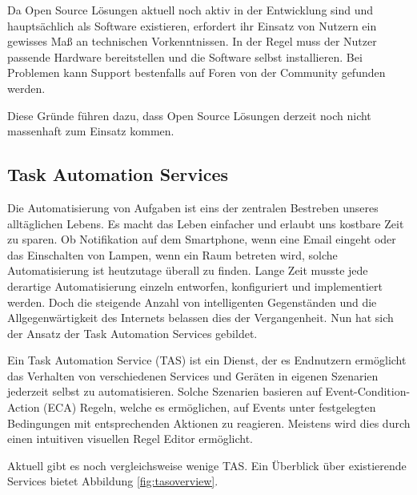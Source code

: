 Da Open Source Lösungen aktuell noch aktiv in der Entwicklung sind und hauptsächlich als Software existieren, erfordert ihr Einsatz von Nutzern ein gewisses Maß an technischen Vorkenntnissen. In der Regel muss der Nutzer passende Hardware bereitstellen und die Software selbst installieren. Bei Problemen kann Support bestenfalls auf Foren von der Community gefunden werden. 

Diese Gründe führen dazu, dass Open Source Lösungen derzeit noch nicht massenhaft zum Einsatz kommen.



\subsection{Task Automation Services}
\label{subsec:tas}
Die Automatisierung von Aufgaben ist eins der zentralen Bestreben unseres alltäglichen Lebens. Es macht das Leben einfacher und erlaubt uns kostbare Zeit zu sparen. Ob Notifikation auf dem Smartphone, wenn eine Email eingeht oder das Einschalten von Lampen, wenn ein Raum betreten wird, solche Automatisierung ist heutzutage überall zu finden. Lange Zeit musste jede derartige Automatisierung einzeln entworfen, konfiguriert und implementiert werden. Doch die steigende Anzahl von intelligenten Gegenständen und die Allgegenwärtigkeit des Internets belassen dies der Vergangenheit. Nun hat sich der Ansatz der Task Automation Services\cite{ieee:tas} gebildet.

Ein Task Automation Service (TAS) ist ein Dienst, der es Endnutzern ermöglicht das Verhalten von verschiedenen Services und Geräten in eigenen Szenarien jederzeit selbst zu automatisieren. Solche Szenarien basieren auf Event-Condition-Action (ECA) Regeln\cite{ECA}, welche es ermöglichen, auf Events unter festgelegten Bedingungen mit entsprechenden Aktionen zu reagieren. Meistens wird dies durch  einen intuitiven visuellen Regel Editor ermöglicht.


Aktuell gibt es noch vergleichsweise wenige TAS. Ein Überblick über existierende  Services bietet Abbildung \ref{fig:tasoverview}.

